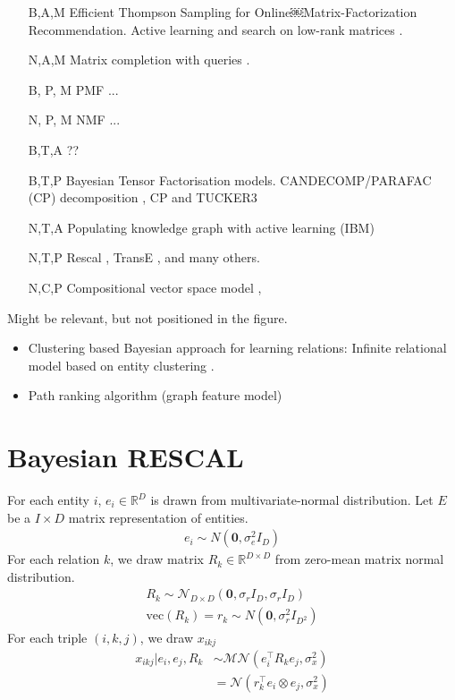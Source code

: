 \documentclass{article}
\begin{document}
\begin{itemize}
\item [B,A,M] Efficient Thompson Sampling for Online￼Matrix-Factorization Recommendation\cite{kawale2015efficient}. Active learning and search on low-rank matrices \cite{sutherland2013active}.
\item [N,A,M] Matrix completion with queries \cite{ruchansky2015matrix}.
\item [B, P, M] PMF \cite{mnih2007probabilistic} ...
\item [N, P, M] NMF\cite{lee1999learning} ...
\item [B,T,A] ??
\item [B,T,P] Bayesian Tensor Factorisation models. CANDECOMP/PARAFAC (CP) decomposition \cite{xiong2010temporal,schmidt2009probabilistic}, CP and TUCKER3 \cite{yilmaz2012algorithms}
\item [N,T,A] Populating knowledge graph with active learning (IBM) \cite{kajino2015active}
\item [N,T,P] Rescal \cite{nickel2011three}, TransE \cite{bordes2013translating}, and many others.
\item [N,C,P] Compositional vector space model \cite{Neelakantan2015}, 
\end{itemize}

Might be relevant, but not positioned in the figure.
\begin{itemize}
\item Clustering based Bayesian approach for learning relations: Infinite relational model based on entity clustering \cite{kemp2006learning}.
\item Path ranking algorithm (graph feature model) \cite{Lao2010}
\end{itemize}

\section{Bayesian RESCAL}

For each entity $i$, $e_i \in \mathbb{R}^{D}$ is drawn from multivariate-normal distribution. Let $E$ be a $I \times D$ matrix representation of entities.
\begin{align}
\label{eqn:entity_gen}
e_i \sim {N}(\mathbf{0}, \sigma_e^2{I}_D)
\end{align}
For each relation $k$, we draw matrix $R_k \in \mathbb{R}^{D\times D}$ from zero-mean matrix normal distribution.
\begin{align}
\label{eqn:relation_gen}
R_k \sim \mathcal{N}_{D \times D}(\mathbf{0}, \sigma_r{I}_D, \sigma_r{I}_D) \\
\text{vec}(R_k) = r_k \sim N(\mathbf{0}, \sigma_r^2 I_{D^2})
\end{align}
For each triple $(i,k,j)$, we draw $x_{ikj}$
\begin{align}
\label{eqn:triple_gen}
x_{ikj} |e_i, e_j, R_k &\sim \mathcal{MN}(e_i^{\top} R_k e_j, \sigma_x^2)\\
& = \mathcal{N}(r_k^{\top} e_i \otimes e_j, \sigma_x^2)
\end{align}
\end{document}
